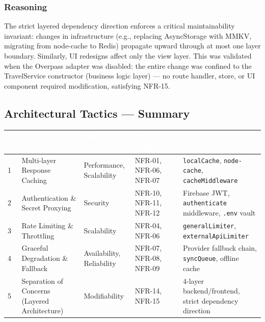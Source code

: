 \documentclass[12pt, a4paper]{article}
\newcommand{\thcell}[1]{\textcolor{white}{\textbf{\small #1}}}
\newcommand{\code}[1]{\texttt{\small #1}}
\begin{document}
\subsubsection{Reasoning}

The strict layered dependency direction enforces a critical maintainability invariant: changes in infrastructure (e.g., replacing AsyncStorage with MMKV, migrating from node-cache to Redis) propagate upward through at most one layer boundary. Similarly, UI redesigns affect only the view layer. This was validated when the Overpass adapter was disabled: the entire change was confined to the TravelService constructor (business logic layer) --- no route handler, store, or UI component required modification, satisfying NFR-15.

\subsection{Architectural Tactics --- Summary}

\begin{longtable}{C{0.5cm} L{3.2cm} L{2.4cm} L{3.0cm} L{3.8cm}}
\toprule
{}
\thcell{\#} & \thcell{Tactic} & \thcell{Quality Attr.} & \thcell{NFRs Addressed} & \thcell{Key Implementation} \\
\midrule
\endhead
\bottomrule
\endfoot

1 & Multi-layer Response Caching & Performance, Scalability & NFR-01, NFR-06, NFR-07 & \code{localCache}, \code{node-cache}, \code{cacheMiddleware} \\

2 & Authentication \& Secret Proxying & Security & NFR-10, NFR-11, NFR-12 & Firebase JWT, \code{authenticate} middleware, \code{.env} vault \\

3 & Rate Limiting \& Throttling & Scalability & NFR-04, NFR-06 & \code{generalLimiter}, \code{externalApiLimiter} \\

4 & Graceful Degradation \& Fallback & Availability, Reliability & NFR-07, NFR-08, NFR-09 & Provider fallback chain, \code{syncQueue}, offline cache \\

5 & Separation of Concerns (Layered Architecture) & Modifiability & NFR-14, NFR-15 & 4-layer backend/frontend, strict dependency direction \\

\end{longtable}
\end{document}
